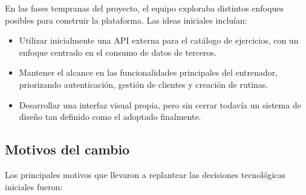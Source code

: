 En las fases tempranas del proyecto, el equipo exploraba distintos enfoques posibles para construir la plataforma. Las ideas iniciales incluían:

\begin{itemize}
  \item Utilizar inicialmente una API externa para el catálogo de ejercicios, con un enfoque centrado en el consumo de datos de terceros.
  \item Mantener el alcance en las funcionalidades principales del entrenador, priorizando autenticación, gestión de clientes y creación de rutinas.
  \item Desarrollar una interfaz visual propia, pero sin cerrar todavía un sistema de diseño tan definido como el adoptado finalmente.
\end{itemize}

\subsection{Motivos del cambio}

Los principales motivos que llevaron a replantear las decisiones tecnológicas iniciales fueron:

